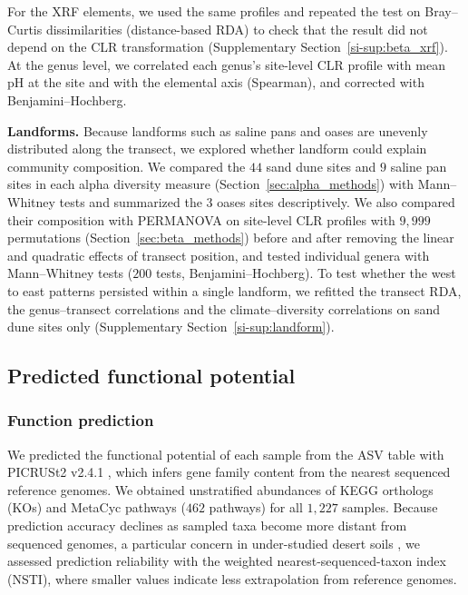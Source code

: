 \documentclass[fleqn,10pt,numbers]{olplainarticle}
\begin{document}
For the XRF elements, we used the same profiles and repeated the test on Bray--Curtis dissimilarities (distance-based RDA) to check that the result did not depend on the CLR transformation (Supplementary Section~\ref{si-sup:beta_xrf}). At the genus level, we correlated each genus's site-level CLR profile with mean pH at the site and with the elemental axis (Spearman), and corrected with Benjamini--Hochberg.

\textbf{Landforms.} Because landforms such as saline pans and oases are unevenly distributed along the transect, we explored whether landform could explain community composition. We compared the $44$ sand dune sites and $9$ saline pan sites in each alpha diversity measure (Section~\ref{sec:alpha_methods}) with Mann--Whitney tests and summarized the $3$ oases sites descriptively. We also compared their composition with PERMANOVA on site-level CLR profiles with $9{,}999$ permutations (Section~\ref{sec:beta_methods}) before and after removing the linear and quadratic effects of transect position, and tested individual genera with Mann--Whitney tests ($200$ tests, Benjamini--Hochberg). To test whether the west to east patterns persisted within a single landform, we refitted the transect RDA, the genus--transect correlations and the climate--diversity correlations on sand dune sites only (Supplementary Section~\ref{si-sup:landform}).


\subsection*{Predicted functional potential}\label{sec:function_methods}
\subsubsection*{Function prediction}\label{sec:function_pred}
We predicted the functional potential of each sample from the ASV table with PICRUSt2 v2.4.1 \cite{douglas2020picrust2}, which infers gene family content from the nearest sequenced reference genomes. We obtained unstratified abundances of KEGG orthologs (KOs) \cite{kanehisa2000kegg} and MetaCyc pathways \cite{metacyc} ($462$ pathways) for all $1{,}227$ samples. Because prediction accuracy declines as sampled taxa become more distant from sequenced genomes, a particular concern in under-studied desert soils \cite{li2023capturing}, we assessed prediction reliability with the weighted nearest-sequenced-taxon index (NSTI), where smaller values indicate less extrapolation from reference genomes.
\end{document}
